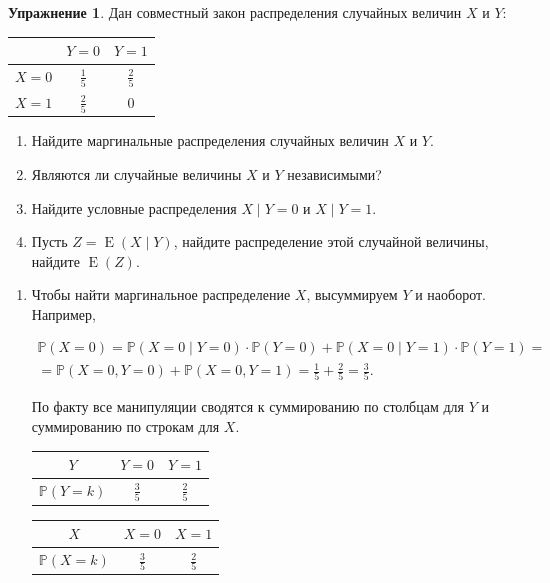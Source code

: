 \documentclass[12pt, a4paper, oneside]{extreport}
\DeclareMathOperator{\E}{\mathop{E}}
\def \mbb{\mathbb}
\def \PP{\mbb{P}}
\theoremstyle{plain}              %
\theoremstyle{definition}         %
\newtheorem{problem}{\color{myblue} Упражнение}
\begin{document}
\begin{problem}

Дан совместный закон распределения случайных величин $X$ и $Y$:	
	
	\begin{center}
		\begin{tabular}{c|c|c}
			&  $Y = 0$    &  $Y = 1$   \\ \hline
			$X = 0$   & $\frac{1}{5}$     &  $\frac{2}{5}$ \\ \hline
			$X = 1$    & $\frac{2}{5}$    &  $0$ \\
		\end{tabular}
	\end{center}

\begin{enumerate}
\item Найдите маргинальные распределения случайных величин $X$ и $Y$. 
\item Являются ли случайные величины $X$ и $Y$ независимыми? 
\item Найдите условные распределения  $X \mid Y = 0$  и $X \mid Y=1$.
\item Пусть $Z = \E(X \mid Y)$, найдите распределение этой случайной величины, найдите $\E(Z)$.
\end{enumerate} 

\begin{sol}
\begin{enumerate}
	\item  Чтобы найти маргинальное распределение $X$, высуммируем $Y$ и наоборот. Например, 
	
	\begin{multline*}
	\PP(X = 0) = \PP(X = 0 \mid Y =0) \cdot \PP(Y=0) + \PP(X = 0 \mid Y = 1) \cdot \PP(Y = 1) = \\ = \PP(X = 0, Y=0) + \PP(X = 0, Y = 1) = \frac{1}{5} + \frac{2}{5} = \frac{3}{5}.
	\end{multline*}
	
По факту все  манипуляции сводятся к суммированию по столбцам для $Y$ и суммированию по строкам для $X$. 
	
	\begin{minipage}[t]{0.45\textwidth}
		\begin{tabular}{c|c|c}
			$Y$&  $Y = 0$    &  $Y = 1$   \\ \hline
			$\PP(Y=k)$   & $\frac{3}{5}$     &  $\frac{2}{5}$ 
		\end{tabular}
	\end{minipage}
	\begin{minipage}[t]{0.45\textwidth}
		\begin{tabular}{c|c|c}
			$X$&  $X = 0$    &  $X = 1$   \\ \hline
			$\PP(X=k)$   & $\frac{3}{5}$     &  $\frac{2}{5}$ 
		\end{tabular}
	\end{minipage}
	

\end{enumerate}
\end{sol}
\end{problem}
\end{document}
